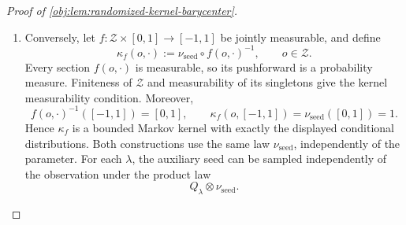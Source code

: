 \begin{proof}[Proof of \cref{obj:lem:randomized-kernel-barycenter}]
\begin{enumerate}
\item Conversely, let \(f:\mathcal Z\times[0,1]\to[-1,1]\) be jointly
measurable, and define
\[
\kappa_f(o,\cdot)
:=
\nu_{\mathrm{seed}}\circ f(o,\cdot)^{-1},
\qquad o\in\mathcal Z.
\]
Every section \(f(o,\cdot)\) is measurable, so its pushforward is a probability
measure. Finiteness of \(\mathcal Z\) and measurability of its singletons give
the kernel measurability condition. Moreover,
\[
f(o,\cdot)^{-1}([-1,1])=[0,1],
\qquad
\kappa_f(o,[-1,1])
=\nu_{\mathrm{seed}}([0,1])=1.
\]
Hence \(\kappa_f\) is a bounded Markov kernel with exactly the displayed
conditional distributions. Both constructions use the same law
\(\nu_{\mathrm{seed}}\), independently of the parameter. For each
\(\lambda\), the auxiliary seed can be sampled independently of the
observation under the product law
\[
Q_\lambda\otimes\nu_{\mathrm{seed}}.
\]
\end{enumerate}
\end{proof}
